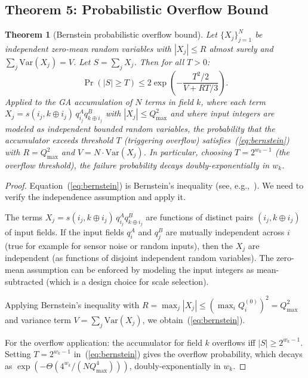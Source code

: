 \documentclass[11pt,a4paper]{article}
\theoremstyle{definition}
\theoremstyle{plain}
\newtheorem{theorem}{Theorem}[section]
\theoremstyle{remark}
\begin{document}
\subsection{Theorem 5: Probabilistic Overflow Bound}
\label{sec:prob}

\begin{theorem}[Bernstein probabilistic overflow bound]
\label{thm:prob}
Let $\{X_j\}_{j=1}^N$ be independent zero-mean random variables with $|X_j| \le R$ almost surely and $\sum_j \mathrm{Var}(X_j) = V$.  Let $S = \sum_j X_j$.  Then for all $T > 0$:
\begin{equation}\label{eq:bernstein}
  \Pr(|S| \ge T) \le 2\exp\!\left(-\frac{T^2/2}{V + RT/3}\right).
\end{equation}
Applied to the GA accumulation of $N$ terms in field $k$, where each term $X_j = s(i_j, k\oplus i_j)\,q_{i_j}^A q_{k\oplus i_j}^B$ with $|X_j|\le Q_\mathrm{max}^2$ and where input integers are modeled as independent bounded random variables, the probability that the accumulator exceeds threshold $T$ (triggering overflow) satisfies~(\ref{eq:bernstein}) with $R = Q_\mathrm{max}^2$ and $V = N \cdot \mathrm{Var}(X_j)$.  In particular, choosing $T = 2^{w_k-1}$ (the overflow threshold), the failure probability decays doubly-exponentially in $w_k$.
\end{theorem}

\begin{proof}
Equation~(\ref{eq:bernstein}) is Bernstein's inequality (see, e.g.,~\cite{boucheron2013}).  We need to verify the independence assumption and apply it.

The terms $X_j = s(i_j,k\oplus i_j)\,q_{i_j}^A q_{k\oplus i_j}^B$ are functions of distinct pairs $(i_j, k\oplus i_j)$ of input fields.  If the input fields $q_i^A$ and $q_j^B$ are mutually independent across $i$ (true for example for sensor noise or random inputs), then the $X_j$ are independent (as functions of disjoint independent random variables).  The zero-mean assumption can be enforced by modeling the input integers as mean-subtracted (which is a design choice for scale selection).

Applying Bernstein's inequality with $R = \max_j |X_j| \le (\max_i Q_i^{(0)})^2 = Q_\mathrm{max}^2$ and variance term $V = \sum_j \mathrm{Var}(X_j)$, we obtain~(\ref{eq:bernstein}).

For the overflow application: the accumulator for field $k$ overflows iff $|S| \ge 2^{w_k-1}$.  Setting $T = 2^{w_k-1}$ in~(\ref{eq:bernstein}) gives the overflow probability, which decays as $\exp(-\Theta(4^{w_k}/(NQ_\mathrm{max}^4)))$, doubly-exponentially in $w_k$.
\end{proof}
\end{document}
